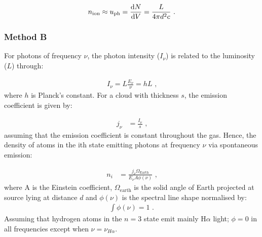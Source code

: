 \begin{equation}
    \begin{aligned}
        n_\text{ion}\approx u_\text{ph}=\dv{N}{V}=\frac{L}{4\pi d^2 c}\text{ .}
    \end{aligned}
\end{equation}

\subsubsection*{Method B}

For photons of frequency $\nu$, the photon intensity ($I_\nu$) is related to the luminosity ($L$) through:

\begin{equation}
    \begin{aligned}
        I_\nu=L\frac{E_\nu}{\nu}=hL\text{ ,}
    \end{aligned}
\end{equation}
\noindent where $h$ is Planck's constant. For a cloud with thickness $s$, the emission coefficient is given by:

\begin{equation}
    \begin{aligned}
        j_\nu&=\frac{I_\nu}{s}\text{ ,}
    \end{aligned}
\end{equation}
\noindent assuming that the emission coefficient is constant throughout the gas. Hence, the density of atoms in the ith state emitting photons at frequency $\nu$ via spontaneous emission:

\begin{equation}
	\begin{aligned}
		n_i&=\frac{j_\nu \Omega_\text{Earth}}{E_\nu A\phi (\nu)}\text{ ,}
	\end{aligned}\label{eq:interstellar_medium_halpha_dens_2}
\end{equation}
where A is the Einstein coefficient, $\Omega_\text{earth}$ is the solid angle of Earth projected at source lying at distance $d$ and $\phi(\nu)$ is the spectral line shape normalised by:
\begin{equation}
	\begin{aligned}
		\int \phi(\nu)=1\text{ .}
	\end{aligned}
\end{equation}
Assuming that hydrogen atoms in the $n=3$ state emit mainly H$\alpha$ light; $\phi=0$ in all frequencies except when $\nu=\nu_{H\alpha}$. 

